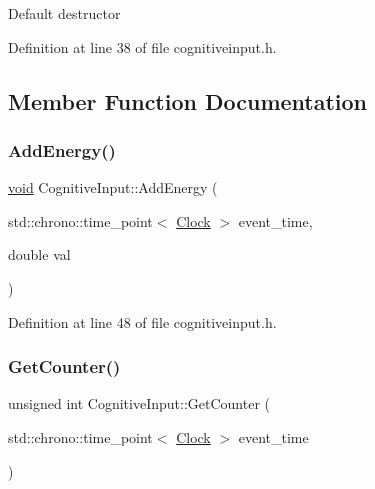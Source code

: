 Default destructor 

Definition at line 38 of file cognitiveinput.\+h.



\subsection{Member Function Documentation}
\mbox{\label{class_cognitive_input_a23f56d012233f655e1530ab61d80c27f}} 
\subsubsection{\texorpdfstring{Add\+Energy()}{AddEnergy()}}
{\footnotesize\ttfamily \mbox{\hyperlink{glad_8h_a950fc91edb4504f62f1c577bf4727c29}{void}} Cognitive\+Input\+::\+Add\+Energy (\begin{DoxyParamCaption}\item[{std\+::chrono\+::time\+\_\+point$<$ \mbox{\hyperlink{universe_8h_a0ef8d951d1ca5ab3cfaf7ab4c7a6fd80}{Clock}} $>$}]{event\+\_\+time,  }\item[{double}]{val }\end{DoxyParamCaption})\hspace{0.3cm}{\ttfamily [inline]}}



Definition at line 48 of file cognitiveinput.\+h.

\mbox{\label{class_cognitive_input_a695e7e57b717210b64f9e2c4e26c8044}} 
\subsubsection{\texorpdfstring{Get\+Counter()}{GetCounter()}}
{\footnotesize\ttfamily unsigned int Cognitive\+Input\+::\+Get\+Counter (\begin{DoxyParamCaption}\item[{std\+::chrono\+::time\+\_\+point$<$ \mbox{\hyperlink{universe_8h_a0ef8d951d1ca5ab3cfaf7ab4c7a6fd80}{Clock}} $>$}]{event\+\_\+time }\end{DoxyParamCaption})\hspace{0.3cm}{\ttfamily [inline]}}



